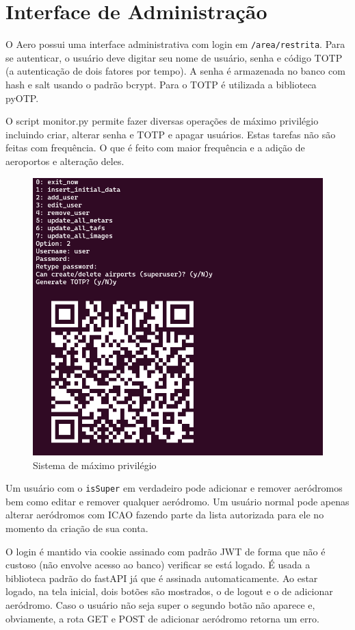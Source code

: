 \chapter{Interface de Administração}

O Aero possui uma interface administrativa com login em \verb|/area/restrita|. 
Para se autenticar,
o usuário deve digitar seu nome de usuário, senha e código TOTP (a autenticação
de dois fatores por tempo). A senha é armazenada no banco com hash e salt usando 
o padrão bcrypt. Para o TOTP é utilizada a biblioteca pyOTP. 

O script monitor.py permite fazer diversas operações de máximo privilégio 
incluindo criar, alterar senha e TOTP e apagar usuários. Estas tarefas não são 
feitas com frequência. O que é feito com maior frequência e a adição de aeroportos 
e alteração deles.

\begin{figure}[ht]
    \begin{center}
    \includegraphics[width=0.8\linewidth]{img/create-user-script.png}
    \caption{Sistema de máximo privilégio}
    \label{fig:max-priv-sys}
    \end{center}
\end{figure}

Um usuário com o \verb|isSuper| em verdadeiro pode adicionar e remover aeródromos 
bem como editar e remover qualquer aeródromo. Um usuário normal pode apenas alterar 
aeródromos com ICAO fazendo parte da lista autorizada para ele no momento da criação
de sua conta.

O login é mantido via cookie assinado com padrão JWT de forma que não é custoso 
(não envolve acesso ao banco) verificar se está logado. É usada a biblioteca padrão 
do fastAPI já que é assinada automaticamente.
Ao estar logado, na tela inicial, dois botões são mostrados, o de logout e o de adicionar 
aeródromo. Caso o usuário não seja super o segundo botão não aparece e, obviamente, 
a rota GET e POST de adicionar aeródromo retorna um erro.

